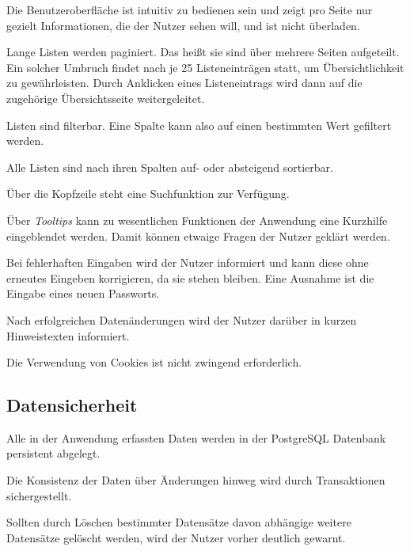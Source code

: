 \begin{description}
	 Die Benutzeroberfläche ist intuitiv zu bedienen sein und zeigt pro Seite nur gezielt Informationen, die der Nutzer sehen will, und ist nicht überladen.

	 Lange Listen werden paginiert. Das heißt sie sind über mehrere Seiten aufgeteilt. Ein solcher Umbruch findet nach je 25 Listeneinträgen statt, um Übersichtlichkeit zu gewährleisten. Durch Anklicken eines Listeneintrags wird dann auf die zugehörige Übersichtsseite weitergeleitet.

	 Listen sind filterbar. Eine Spalte kann also auf einen bestimmten Wert gefiltert werden.

	 Alle Listen sind nach ihren Spalten auf- oder absteigend sortierbar.

	 Über die Kopfzeile steht eine Suchfunktion zur Verfügung.

	 Über \emph{Tooltips} kann zu wesentlichen Funktionen der Anwendung eine Kurzhilfe eingeblendet werden. Damit können etwaige Fragen der Nutzer geklärt werden.

	 Bei fehlerhaften Eingaben wird der Nutzer informiert und kann diese ohne erneutes Eingeben korrigieren, da sie stehen bleiben. Eine Ausnahme ist die Eingabe eines neuen Passworts.

	 Nach erfolgreichen Datenänderungen wird der Nutzer darüber in kurzen Hinweistexten informiert.

	 Die Verwendung von Cookies ist nicht zwingend erforderlich.
\end{description}

\subsection{Datensicherheit}

\begin{description}
	 Alle in der Anwendung erfassten Daten werden in der PostgreSQL Datenbank persistent abgelegt.

	 Die Konsistenz der Daten über Änderungen hinweg wird durch Transaktionen sichergestellt.

	 Sollten durch Löschen bestimmter Datensätze davon abhängige weitere Datensätze gelöscht werden, wird der Nutzer vorher deutlich gewarnt.
\end{description}

